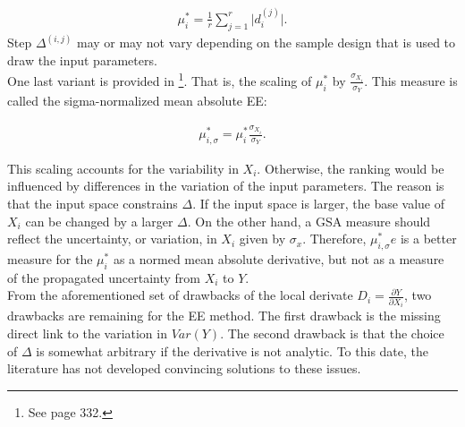 \documentclass[a4paper,12pt]{article}
\begin{document}
\begin{align}
\mu_i^* = \frac{1}{r} \sum_{j=1}^{r} \big| d_i^{(j)} \big|.
\end{align}
\noindent
Step $\Delta^{(i,j)}$ may or may not vary depending on the sample design that is used to draw the input parameters.\\


\noindent
One last variant is provided in \cite{Smith.2014}\footnote{See page 332.}. That is, the scaling of $\mu_{i}^*$ by $\frac{\sigma_{X_i}}{\sigma_Y}$. This measure is called the sigma-normalized mean absolute EE: 


\begin{align}
\mu_{i,\sigma}^* = \mu_i^* \frac{\sigma_{X_i}}{\sigma_Y}.
\end{align}

\noindent
This scaling accounts for the variability in $X_i$. Otherwise, the ranking would be influenced by differences in the variation of the input parameters. The reason is that the input space constrains $\Delta$. If the input space is larger, the base value of $X_i$ can be changed by a larger $\Delta$. On the other hand, a GSA measure should reflect the uncertainty, or variation, in $X_i$ given by $\sigma_x$. Therefore, $\mu_{i,\sigma}^*e$ is a better measure for the $\mu_{i}^*$ as a normed mean absolute derivative, but not as a measure of the propagated uncertainty from $X_i$ to $Y$. \\


\noindent
From the aforementioned set of drawbacks of the local derivate $D_i = \frac{\partial Y}{\partial X_i}$, two drawbacks are remaining for the EE method. The first drawback is the missing direct link to the variation in $Var(Y)$. The second drawback is that the choice of $\Delta$ is somewhat arbitrary if the derivative is not analytic. To this date, the literature has not developed convincing solutions to these issues.
\end{document}
